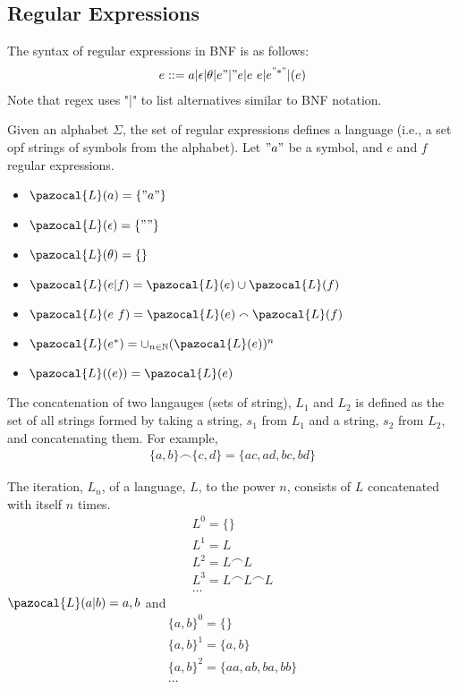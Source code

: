 \subsection{Regular Expressions}
The syntax of regular expressions in BNF is as follows:
\begin{align*}
    e :: = a | \epsilon | \theta | e"|"e | e \ e | e^{"*"} | (e)
\end{align*}
Note that regex uses "|" to list alternatives similar to BNF notation.

Given an alphabet $\Sigma$, the set of regular expressions defines a language (i.e., a set opf strings of symbols from the alphabet). Let $"a"$ be a symbol, and $e$ and $f$ regular expressions.

\begin{itemize}
    \item $\pazocal{L}(a) = \{"a"\}$
    \item $\pazocal{L}(\epsilon) = \{"" \}$
    \item $\pazocal{L}(\theta) = \{ \}$
    \item $\pazocal{L}(e | f) = \pazocal{L}(e) \cup \pazocal{L}(f)$
    \item $\pazocal{L}(e \ f) = \pazocal{L}(e) \smallfrown \pazocal{L}(f)$
    \item $\pazocal{L}(e^{*}) = \cup _{n \in \mathbb{N}} (\pazocal{L}(e))^n$
    \item $\pazocal{L}((e)) = \pazocal{L}(e)$
\end{itemize}

The concatenation of two langauges (sets of string), $L_1$ and $L_2$ is defined as the set of all strings formed by taking a string, $s_1$ from $L_1$ and a string, $s_2$ from $L_2$, and concatenating them. For example, 
\begin{align*}
    \{a, b\} \smallfrown \{c, d\} = \{ac, ad, bc, bd\}
\end{align*}

The iteration, $L_n$, of a language, $L$, to the power $n$, consists of $L$ concatenated with itself $n$ times. 
\begin{align*}
    L^0 = \{\} \\
    L^1 = L \\
    L^2 = L \smallfrown L \\
    L^3 = L \smallfrown L \smallfrown L \\
    \dots
\end{align*}
$\pazocal{L}(a|b) = {a, b}$  and
\begin{align*}
    \{a, b\}^0 = \{\}\\
    \{a, b\}^1 = \{a, b\}\\
    \{a, b\}^2 = \{aa, ab, ba, bb\}\\
    \dots
\end{align*}

